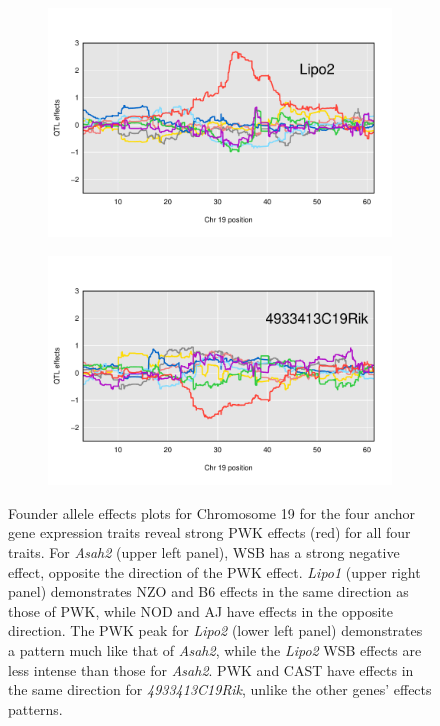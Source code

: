\documentclass{article}
\begin{document}
\begin{figure}
    \begin{subfigure}[t]{0.5\linewidth}
        \includegraphics[width = \linewidth]{../Rmd/allele_effects_Lipo2.pdf}
    \end{subfigure}
    \begin{subfigure}[t]{0.5\linewidth}
        \includegraphics[width = \linewidth]{../Rmd/allele_effects_4933413C19Rik.pdf}
    \end{subfigure}
        \caption{Founder allele effects plots for Chromosome 19 for the four anchor gene expression traits reveal strong PWK effects (red) for all four traits. For \emph{Asah2} (upper left panel), WSB has a strong negative effect, opposite the direction of the PWK effect. \emph{Lipo1} (upper right panel) demonstrates NZO and B6 effects in the same direction as those of PWK, while NOD and AJ have effects in the opposite direction. The PWK peak for \emph{Lipo2} (lower left panel) demonstrates a pattern much like that of \emph{Asah2}, while the \emph{Lipo2} WSB effects are less intense than those for \emph{Asah2}. PWK and CAST have effects in the same direction for \emph{4933413C19Rik}, unlike the other genes' effects patterns.}\label{fig:founder-allele-effects}
\end{figure}
\end{document}
